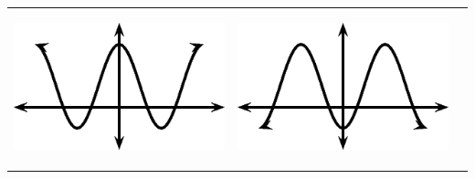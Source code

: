 \begin{center}
\begin{xtabular*}{\mytablewidth}[t]{|p{10\mystarwidth}|p{10\mystarwidth}|p{10\mystarwidth}|}
                  
    \setcounter{subfigure}{0}

\label{m39414*id88184}
    \begin{center}
    \label{m39414*id88184!!!underscore!!!media}\label{m39414*id88184!!!underscore!!!printimage}\includegraphics{col11306.imgs/m39414_MG10C15_026.png} %
        
      \vspace{2pt}
    \vspace{.1in}
    
    \end{center}



    \addtocounter{footnote}{-0}
    
                 &
    
    
        
                  
    \setcounter{subfigure}{0}

\label{m39414*id88196}
    \begin{center}
    \label{m39414*id88196!!!underscore!!!media}\label{m39414*id88196!!!underscore!!!printimage}\includegraphics{col11306.imgs/m39414_MG10C15_027.png} %
        
      \vspace{2pt}
    \vspace{.1in}
    

\end{center}
\end{xtabular*}
\end{center}
